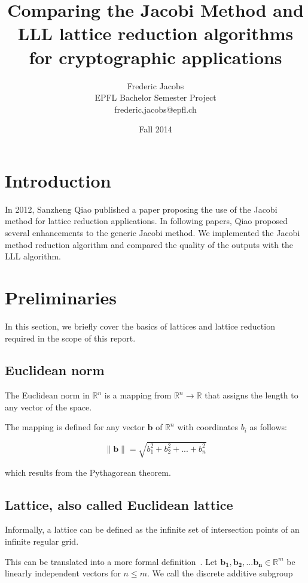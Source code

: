\documentclass[10pt, a4paper]{article}
\title{Comparing the Jacobi Method and LLL lattice reduction algorithms for cryptographic applications}
\date{Fall 2014}
\author{Frederic Jacobs\\ EPFL Bachelor Semester Project\\ frederic.jacobs@epfl.ch}
\renewcommand{\vec}[1]{\mathbf{#1}}
\begin{document}
\maketitle

\section{Introduction}
In 2012, Sanzheng Qiao published a paper\cite{originalJacobiMethodLatticeBasisReduction} proposing the use of the Jacobi method for lattice reduction applications. In following papers, Qiao proposed several enhancements to the generic Jacobi method. We implemented the Jacobi method reduction algorithm and compared the quality of the outputs with the LLL algorithm.
 
\section{Preliminaries}

In this section, we briefly cover the basics of lattices and lattice reduction required in the scope of this report.

\subsection{Euclidean norm}

The Euclidean norm in $\mathbb{R}^n$ is a mapping from $\mathbb{R}^n \to \mathbb{R}$ that assigns the length to any vector of the space.

The mapping is defined for any vector $\vec{b}$ of $\mathbb{R}^n$ with coordinates $b_i$ as follows: 

\[
\|\mathbf{b}\| = \sqrt{b_1^2 + b_2^2 + ... + b_n^2} 
\] 

which results from the Pythagorean theorem.

\subsection{Lattice, also called Euclidean lattice}

\begin{center}
\hspace{2cm}

\end{center}

Informally, a lattice can be defined as the infinite set of intersection points of an infinite regular grid.

This can be translated into a more formal definition~\cite{SchnorrStanfordNotes}.\newline 
Let $\vec{b_1}, \vec{b_2}, ... \vec{b_n} \in \mathbb{R}^m$ be linearly independent vectors for $n\leq m$. We call the discrete additive subgroup
\end{document}
